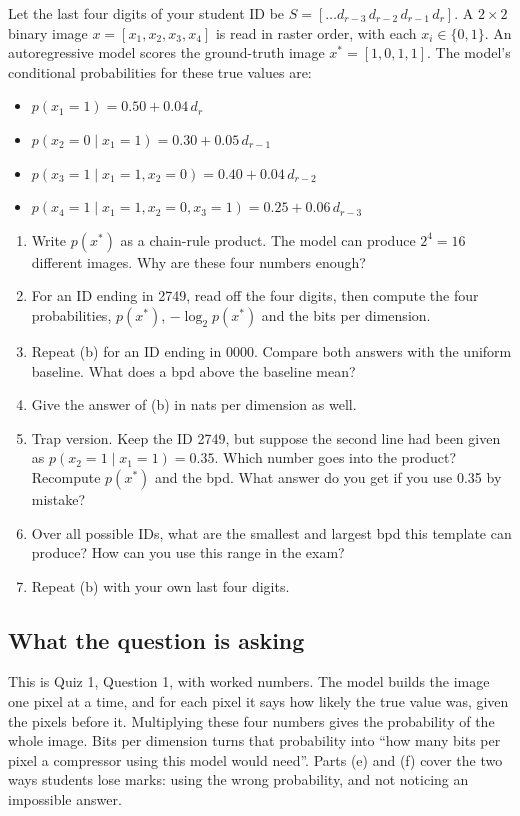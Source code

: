 \documentclass[12pt,a4paper]{article}
\begin{document}
Let the last four digits of your student ID be $S=[\dots d_{r-3}\,d_{r-2}\,d_{r-1}\,d_r]$. A $2\times2$ binary image $x=[x_1,x_2,x_3,x_4]$ is read in raster order, with each $x_i\in\{0,1\}$. An autoregressive model scores the ground-truth image $x^*=[1,0,1,1]$. The model's conditional probabilities for these true values are:
\begin{itemize}[nosep]
  \item $p(x_1=1)=0.50+0.04\,d_r$
  \item $p(x_2=0\mid x_1=1)=0.30+0.05\,d_{r-1}$
  \item $p(x_3=1\mid x_1=1,x_2=0)=0.40+0.04\,d_{r-2}$
  \item $p(x_4=1\mid x_1=1,x_2=0,x_3=1)=0.25+0.06\,d_{r-3}$
\end{itemize}
\begin{enumerate}[label=(\alph*)]
  \item Write $p(x^*)$ as a chain-rule product. The model can produce $2^4=16$ different images. Why are these four numbers enough?
  \item For an ID ending in 2749, read off the four digits, then compute the four probabilities, $p(x^*)$, $-\log_2p(x^*)$ and the bits per dimension.
  \item Repeat (b) for an ID ending in 0000. Compare both answers with the uniform baseline. What does a bpd above the baseline mean?
  \item Give the answer of (b) in nats per dimension as well.
  \item Trap version. Keep the ID 2749, but suppose the second line had been given as $p(x_2=1\mid x_1=1)=0.35$. Which number goes into the product? Recompute $p(x^*)$ and the bpd. What answer do you get if you use 0.35 by mistake?
  \item Over all possible IDs, what are the smallest and largest bpd this template can produce? How can you use this range in the exam?
  \item Repeat (b) with your own last four digits.
\end{enumerate}

\subsection{What the question is asking}

This is Quiz 1, Question 1, with worked numbers. The model builds the image one pixel at a time, and for each pixel it says how likely the true value was, given the pixels before it. Multiplying these four numbers gives the probability of the whole image. Bits per dimension turns that probability into ``how many bits per pixel a compressor using this model would need''. Parts (e) and (f) cover the two ways students lose marks: using the wrong probability, and not noticing an impossible answer.
\end{document}
